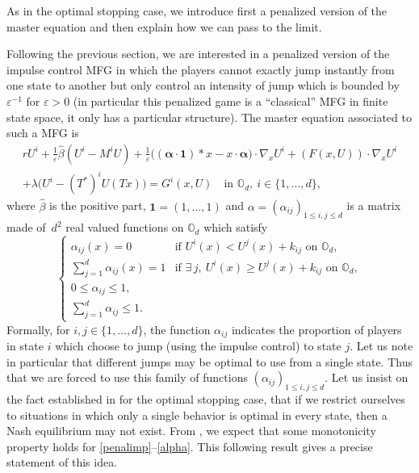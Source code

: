 \documentclass[JEP,XML,SOM,Unicode,NoEqCountersInSection,published]{cedram}
\newcommand{\One}{\mathbf{1}}
\let\epsilon\varepsilon
\theoremstyle{definition}
\begin{document}
As in the optimal stopping case, we introduce first a penalized version of the master equation and then explain how we can pass to the limit.

Following the previous section, we are interested in a penalized version of the impulse control MFG in which the players cannot exactly jump instantly from one state to another but only control an intensity of jump which is bounded by $\epsilon^{-1}$ for $\epsilon > 0$ (in particular this penalized game is a ``classical'' MFG in finite state space, it only has a particular structure). The master equation associated to such a MFG is
\begin{multline}\label{penalimp}
rU^i + \frac{1}{\epsilon} \hat{\beta} (U^i-M^iU) +\frac{1}{\epsilon}\bigl((\boldsymbol{\alpha}\cdot\One)* x-x\cdot \boldsymbol{\alpha} \bigr)\cdot \nabla_x U^i+ (F(x,U))\cdot \nabla_x U^i\\
+\lambda \bigl(U^i-(T^*)^i U(Tx)\bigr) = G^i(x,U) \quad\text{in } \mathbb{O}_d,\ i \in \{1,\dots,d\},
\end{multline}
where $\hat{\beta}$ is the positive part, $\One = (1,\dots,1)$ and $\alpha = (\alpha_{ij})_{1 \leq i,j\leq d}$ is a matrix made of~$d^2$ real valued functions on $\mathbb{O}_d$ which satisfy
\begin{equation}\label{alpha}
\begin{cases}
\alpha_{ij}(x) = 0 &\text{if } U^i(x) < U^j(x)+k_{ij} \text{ on } \mathbb{O}_d,\\
\sum_{j = 1}^d \alpha_{ij}(x) = 1 &\text{if } \exists\, j,\ U^i(x) \geq U^j(x)+k_{ij} \text{ on } \mathbb{O}_d,\\
0 \leq \alpha_{ij} \leq 1,\\
\sum_{j = 1}^d \alpha_{ij} \leq 1.
\end{cases}
\end{equation}
Formally, for $i, j \in \{1,\dots,d\}$, the function $\alpha_{ij}$ indicates the proportion of players in state $i$ which choose to jump (using the impulse control) to state $j$. Let us note in particular that different jumps may be optimal to use from a single state. Thus that we are forced to use this family of functions $(\alpha_{ij})_{1\leq i,j \leq d}$. Let us insist on the fact established in \cite{bertucci2018optimal} for the optimal stopping case, that if we restrict ourselves to situations in which only a single behavior is optimal in every state, then a Nash equilibrium may not exist. From \cite{bertucci2020fokker}, we expect that some monotonicity property holds for \eqref{penalimp}--\eqref{alpha}. This following result gives a precise statement of this idea.
\end{document}
